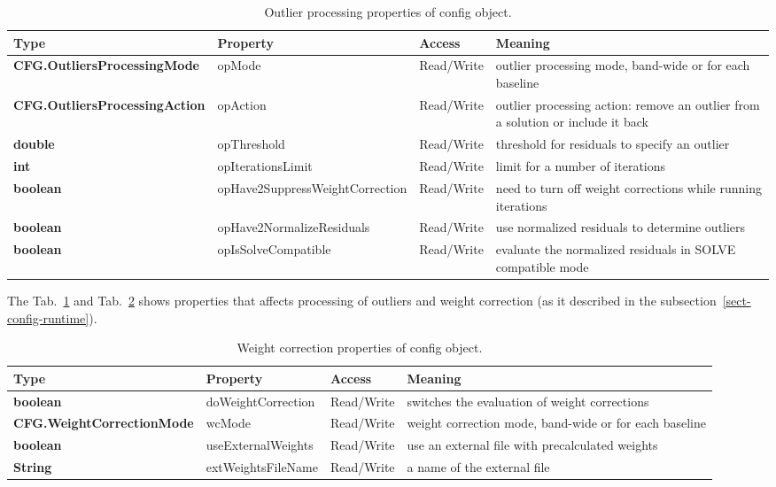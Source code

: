\documentclass [10pt,letterpaper]{report}
\begin{document}
\begin{table}[htb]
\centering
\footnotesize
\begin{tabular}{lllp{}}
\hline
Type & Property & Access & Meaning\\
\hline
  {\bf CFG.OutliersProcessingMode} & opMode & Read/Write & outlier processing mode, band-wide or for each baseline\\
  {\bf CFG.OutliersProcessingAction} & opAction & Read/Write & outlier processing action: remove an outlier from a solution or include it back\\
  {\bf double} & opThreshold & Read/Write & threshold for residuals to specify an outlier\\
  {\bf int} & opIterationsLimit & Read/Write & limit for a number of iterations\\
  {\bf boolean} & opHave2SuppressWeightCorrection & Read/Write & need to turn off weight corrections while running iterations\\
  {\bf boolean} & opHave2NormalizeResiduals & Read/Write & use normalized residuals to determine outliers\\
  {\bf boolean} & opIsSolveCompatible & Read/Write & evaluate the normalized residuals in SOLVE compatible mode\\
\hline
\end{tabular}
\caption{Outlier processing properties of config object.}
\label{tab-scr-config-properties-2}
\end{table}


The Tab.~\ref{tab-scr-config-properties-2} and Tab.~\ref{tab-scr-config-properties-3} shows properties that affects processing
of outliers and weight correction (as it described in the subsection~\ref{sect-config-runtime}).

\begin{table}[htb]
\centering
\footnotesize
\begin{tabular}{lllp{}}
\hline
Type & Property & Access & Meaning\\
\hline
  {\bf boolean} & doWeightCorrection & Read/Write & switches the evaluation of weight corrections\\
  {\bf CFG.WeightCorrectionMode} & wcMode & Read/Write & weight correction mode, band-wide or for each baseline\\
  {\bf boolean} & useExternalWeights & Read/Write & use an external file with precalculated weights\\
  {\bf String} & extWeightsFileName & Read/Write & a name of the external file\\
\hline
\end{tabular}
\caption{Weight correction properties of config object.}
\label{tab-scr-config-properties-3}
\end{table}
\end{document}
